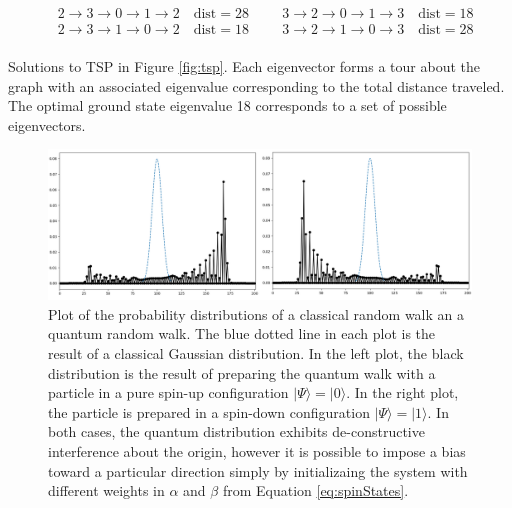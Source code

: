 \begin{table}[h]
\[\begin{split}
			&2 \rightarrow 3 \rightarrow 0 \rightarrow 1 \rightarrow 2 \quad \text{dist}=28 \hspace{1cm} 3 \rightarrow 2 \rightarrow 0 \rightarrow 1 \rightarrow 3 \quad \text{dist}=18\\
			&2 \rightarrow 3 \rightarrow 1 \rightarrow 0 \rightarrow 2 \quad \text{dist}=18 \hspace{1cm} 3 \rightarrow 2 \rightarrow 1 \rightarrow 0 \rightarrow 3 \quad \text{dist}=28\\
		\end{split}
		\]
		\caption{Solutions to TSP in Figure \ref{fig:tsp}. Each eigenvector forms a tour about the graph with an associated eigenvalue corresponding to the total distance traveled. The optimal ground state eigenvalue 18 corresponds to a set of possible eigenvectors.}
		\label{tab:eigenset}
	\end{table}
	\begin{center}
		\begin{figure}[h]
			\begin{center}
				\includegraphics[width=16cm]{images/bias}
			\end{center}
			\caption{Plot of the probability distributions of a classical random walk an a quantum random walk. The blue dotted line in each plot is the result of a classical Gaussian distribution. In the left plot, the black distribution is the result of preparing the quantum walk with a particle in a pure spin-up configuration $|\Psi\rangle = |0\rangle$. In the right plot, the particle is prepared in a spin-down configuration $|\Psi\rangle = |1\rangle$. In both cases, the quantum distribution exhibits de-constructive interference about the origin, however it is possible to impose a bias toward a particular direction simply by initializaing the system with different weights in $\alpha$ and $\beta$ from Equation \ref{eq:spinStates}.}
			\label{fig:biasWalk}
		\end{figure}
	\end{center}

